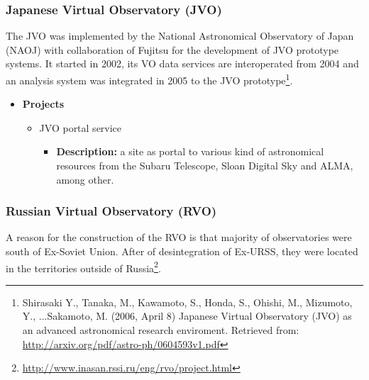 \subsubsection{Japanese Virtual Observatory (JVO)}
The JVO \cite{website:jvo-home} \nocite{IshiharaMizumotoOhishiKawaray2004} was
implemented by the National Astronomical Observatory of Japan (NAOJ) with
collaboration of Fujitsu for the development of JVO prototype systems. It
started in 2002, its VO data services are interoperated from 2004 and an
analysis system was integrated in 2005 to the JVO prototype\footnote{Shirasaki
Y., Tanaka, M., Kawamoto, S., Honda, S., Ohishi, M., Mizumoto, Y., ...Sakamoto,
M. (2006, April 8) Japanese Virtual Observatory (JVO) as an advanced
astronomical research enviroment. Retrieved from:
\url{http://arxiv.org/pdf/astro-ph/0604593v1.pdf}}.

\begin{itemize}
\item \textbf{Projects}
\begin{itemize}
\item JVO portal service
\begin{itemize}
\item \textbf{Description:} a site as portal to various kind of astronomical
resources from the Subaru Telescope, Sloan Digital Sky and ALMA, among other.
\end{itemize}
\end{itemize}
\end{itemize}

\subsubsection{Russian Virtual Observatory (RVO)}
A reason for the construction of the RVO \cite{website:rvo-home} is that
majority of observatories were south of Ex-Soviet Union. After of desintegration
of Ex-URSS, they were located in the territories outside of
Russia\footnote{\url{http://www.inasan.rssi.ru/eng/rvo/project.html}}.

